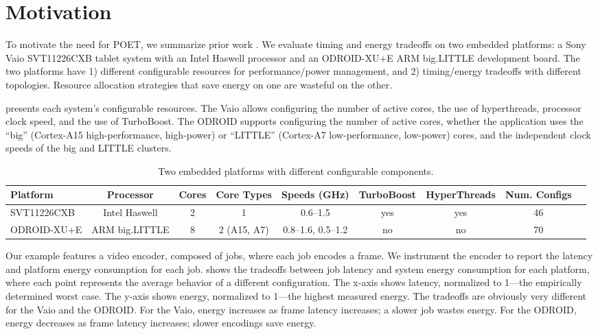 \section{Motivation}
\label{sec:poet-motivation}

To motivate the need for POET, we summarize prior work \cite{Imes2014}.
We evaluate timing and energy tradeoffs on two embedded platforms: a Sony Vaio SVT11226CXB tablet system with an Intel Haswell processor and an ODROID-XU+E ARM big.LITTLE development board.
The two platforms have 1) different configurable resources for performance/power management, and 2) timing/energy tradeoffs with different topologies.
Resource allocation strategies that save energy on one are wasteful on the other.

 presents each system's configurable resources.
The Vaio allows configuring the number of active cores, the use of hyperthreads, processor clock speed, and the use of TurboBoost.
The ODROID supports configuring the number of active cores, whether the application uses the ``big'' (Cortex-A15 high-performance, high-power) or ``LITTLE'' (Cortex-A7 low-performance, low-power) cores, and the independent clock speeds of the big and LITTLE clusters.

\begin{table}[t]
\caption{Two embedded platforms with different configurable components.}
\label{tbl:poet-machines}
\tiny
\centering
\begin{tabular}{lcccccccc}
  \textbf{Platform} & 
  \textbf{Processor} &
  \textbf{Cores} & 
  \textbf{Core Types} &
  \textbf{Speeds (GHz)} &
  \textbf{TurboBoost} &
  \textbf{HyperThreads} & 
  \textbf{Num. Configs} \\
  \hline
  \hline
  SVT11226CXB & Intel Haswell  & 2 & 1             & 0.6--1.5          & yes & yes & 46 \\
  ODROID-XU+E & ARM big.LITTLE & 8 & 2 (A15, A7)   & 0.8--1.6, 0.5--1.2 & no  & no  & 70 \\
  \hline 
  \hline
\end{tabular}
\end{table}

Our example features a video encoder, composed of jobs, where each job encodes a frame.
We instrument the encoder to report the latency and platform energy consumption for each job.
 shows the tradeoffs between job latency and system energy consumption for each platform, where each point represents the average behavior of a different configuration.
The x-axis shows latency, normalized to 1---the empirically determined worst case.
The y-axis shows energy, normalized to 1---the highest measured energy.
The tradeoffs are obviously very different for the Vaio and the ODROID.
For the Vaio, energy increases as frame latency increases; \ie a slower job wastes energy.
For the ODROID, energy decreases as frame latency increases; \ie slower encodings save energy.

